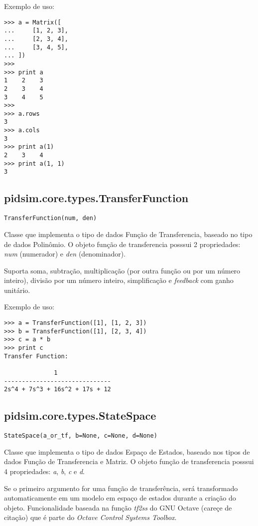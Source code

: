     Exemplo de uso:
    
    \begin{verbatim}
>>> a = Matrix([
...     [1, 2, 3],
...     [2, 3, 4],
...     [3, 4, 5],
... ])
>>>
>>> print a
1    2    3
2    3    4
3    4    5
>>>
>>> a.rows
3
>>> a.cols
3
>>> print a(1)
2    3    4
>>> print a(1, 1)
3
    \end{verbatim}

\subsection{pidsim.core.types.TransferFunction}

    \begin{verbatim}
TransferFunction(num, den)
    \end{verbatim}

    Classe que implementa o tipo de dados Função de Transferencia, baseado
    no tipo de dados Polinômio. O objeto função de transferencia posssui
    2 propriedades: \textit{num} (numerador) e \textit{den} (denominador).
    
    Suporta soma, subtração, multiplicação (por outra função ou por um
    número inteiro), divisão por um número inteiro, simplificação e
    \textit{feedback} com ganho unitário.
    
    Exemplo de uso:
    
    \begin{verbatim}
>>> a = TransferFunction([1], [1, 2, 3])
>>> b = TransferFunction([1], [2, 3, 4])
>>> c = a * b
>>> print c
Transfer Function:

              1               
------------------------------
2s^4 + 7s^3 + 16s^2 + 17s + 12
    \end{verbatim}

\subsection{pidsim.core.types.StateSpace}

    \begin{verbatim}
StateSpace(a_or_tf, b=None, c=None, d=None)
    \end{verbatim}

    Classe que implementa o tipo de dados Espaço de Estados, baseado
    nos tipos de dados Função de Transferencia e Matriz. O objeto função
    de transferencia posssui 4 propriedades: \textit{a}, \textit{b},
    \textit{c} e \textit{d}.
    
    Se o primeiro argumento for uma função de transferência, será transformado
    automaticamente em um modelo em espaço de estados durante a criação do
    objeto. Funcionalidade baseada na função \textit{tf2ss} do GNU Octave
    (careçe de citação) que é parte do \textit{Octave Control Systems Toolbox}.
    
